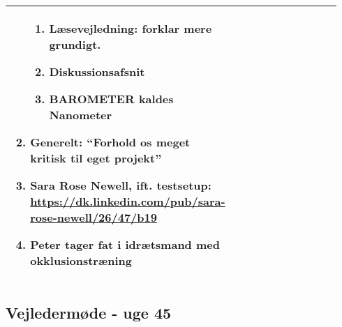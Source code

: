 \begin{longtable}{|p{0.24\linewidth}|p{0.7\linewidth}|}
\begin{enumerate}
\begin{enumerate}
				\item Læsevejledning: forklar mere grundigt. 
				\item Diskussionsafsnit
				\item BAROMETER kaldes Nanometer 
			\end{enumerate}
			\item Generelt: “Forhold os meget kritisk til eget projekt”
			\item Sara Rose Newell, ift. testsetup: \url{https://dk.linkedin.com/pub/sara-rose-newell/26/47/b19}
			\item Peter tager fat i idrætsmand med okklusionstræning
		\end{enumerate}
		\\ \hline
	\end{longtable}
	
	\subsection{Vejledermøde - uge 45} \label{app:vejlederuge45}
